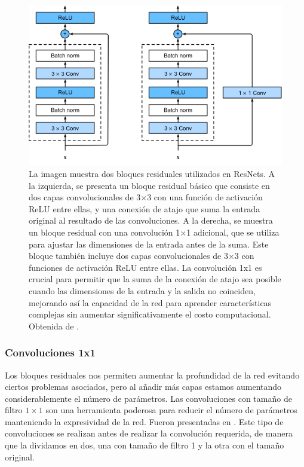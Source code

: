 \begin{figure}
    \centering
    \includegraphics[width=0.75\linewidth]{Plantilla_TFG_latex//imagenes//Inf//2.Fund/resblock1x1.png}
    \caption[Bloques residuales utilizados en \textit{Residual Networks}]{La imagen muestra dos bloques residuales utilizados en ResNets. A la izquierda, se presenta un bloque residual básico que consiste en dos capas convolucionales de 3$\times$3 con una función de activación ReLU entre ellas, y una conexión de atajo que suma la entrada original al resultado de las convoluciones. A la derecha, se muestra un bloque residual con una convolución 1$\times$1 adicional, que se utiliza para ajustar las dimensiones de la entrada antes de la suma. Este bloque también incluye dos capas convolucionales de 3$\times$3 con funciones de activación ReLU entre ellas. La convolución 1x1 es crucial para permitir que la suma de la conexión de atajo sea posible cuando las dimensiones de la entrada y la salida no coinciden, mejorando así la capacidad de la red para aprender características complejas sin aumentar significativamente el costo computacional. Obtenida de \cite{divedeeplearning}.}
    \label{fig:resblock1x1}
\end{figure}

\subsubsection{Convoluciones 1x1}


Los bloques residuales nos permiten aumentar la profundidad de la red evitando ciertos problemas asociados, pero al añadir más capas estamos aumentando considerablemente el número de parámetros. Las convoluciones con tamaño de filtro $1 \times 1$ son una herramienta poderosa para reducir el número de parámetros manteniendo la expresividad de la red. Fueron presentadas en \cite{bottleorig}. Este tipo de convoluciones se realizan antes de realizar la convolución requerida, de manera que la dividamos en dos, una con tamaño de filtro 1 y la otra con el tamaño original.

